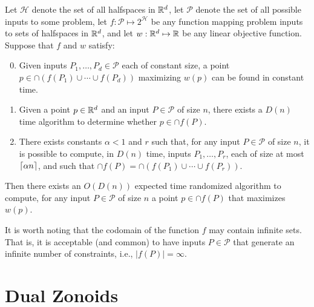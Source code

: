 \documentclass[lotsofwhite]{patmorin}
\begin{document}
\begin{thm}[Chan 2004]
Let $\mathcal{H}$ denote the set of all halfspaces in $\mathbb{R}^d$,
let $\mathcal{P}$ denote the set of all possible inputs to some problem, 
let $f:\mathcal{P}\mapsto 2^{\mathcal{H}}$ be any function mapping 
problem inputs to sets of halfspaces in $\mathbb{R}^d$,
and let $w:\mathbb{R}^d\mapsto \mathbb{R}$ be
any linear objective function.  Suppose that $f$ and $w$ satisfy:
\begin{enumerate}
\setcounter{enumi}{-1}
\item Given inputs $P_1,\ldots,P_d\in\mathcal{P}$ each of constant
size, a point $p\in\cap (f(P_1)\cup\cdots\cup f(P_d))$ maximizing
$w(p)$ can be found in constant time.

\item Given a point $p\in\mathbb{R}^d$ and an input $P\in\mathcal{P}$
of size $n$, there exists a $D(n)$ time algorithm to determine whether
$p\in\cap f(P)$.

\item There exists constants $\alpha < 1$ and $r$ such that, for any
input $P\in\mathcal{P}$ of size $n$, it is possible to compute, in
$D(n)$ time, inputs $P_1,\ldots,P_r$, each of size at most
$\left\lceil \alpha n \right\rceil$, and such that $\cap f(P) =
\cap(f(P_1)\cup\cdots\cup f(P_r))$.

\end{enumerate}
Then there exists an $O(D(n))$ expected time randomized algorithm to
compute, for any input $P\in\mathcal{P}$ of size $n$ a point
$p\in\cap f(P)$ that maximizes $w(p)$.
\end{thm}

It is worth noting that the codomain of the function $f$ may contain
infinite sets.  That is, it is acceptable (and common) to have inputs
$P\in\mathcal{P}$ that generate an infinite number of constraints,
i.e., $|f(P)|=\infty$.


\section{Dual Zonoids}
\end{document}
